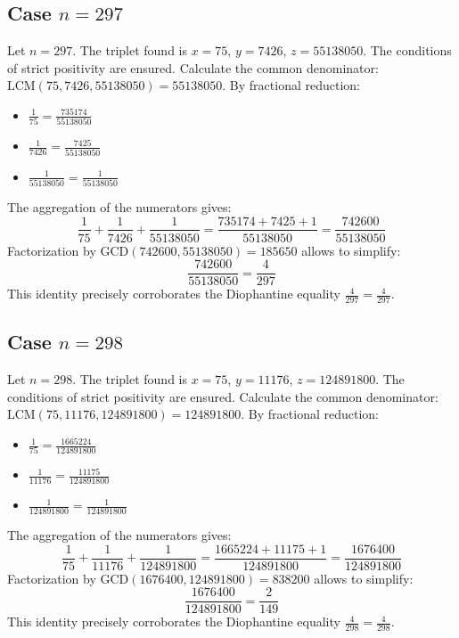 \documentclass[11pt,a4paper]{article}
\begin{document}
\subsection{Case $n = 297$}
Let $n = 297$. The triplet found is $x = 75$, $y = 7426$, $z = 55138050$.
The conditions of strict positivity are ensured.
Calculate the common denominator: $\text{LCM}(75, 7426, 55138050) = 55138050$.
By fractional reduction:
\begin{itemize}
    \item $\frac{1}{75} = \frac{735174}{55138050}$
    \item $\frac{1}{7426} = \frac{7425}{55138050}$
    \item $\frac{1}{55138050} = \frac{1}{55138050}$
\end{itemize}
The aggregation of the numerators gives:
$$ \frac{1}{75} + \frac{1}{7426} + \frac{1}{55138050} = \frac{735174 + 7425 + 1}{55138050} = \frac{742600}{55138050} $$
Factorization by $\text{GCD}(742600, 55138050) = 185650$ allows to simplify:
$$ \frac{742600}{55138050} = \frac{4}{297} $$
This identity precisely corroborates the Diophantine equality $\frac{4}{297} = \frac{4}{297}$.

\subsection{Case $n = 298$}
Let $n = 298$. The triplet found is $x = 75$, $y = 11176$, $z = 124891800$.
The conditions of strict positivity are ensured.
Calculate the common denominator: $\text{LCM}(75, 11176, 124891800) = 124891800$.
By fractional reduction:
\begin{itemize}
    \item $\frac{1}{75} = \frac{1665224}{124891800}$
    \item $\frac{1}{11176} = \frac{11175}{124891800}$
    \item $\frac{1}{124891800} = \frac{1}{124891800}$
\end{itemize}
The aggregation of the numerators gives:
$$ \frac{1}{75} + \frac{1}{11176} + \frac{1}{124891800} = \frac{1665224 + 11175 + 1}{124891800} = \frac{1676400}{124891800} $$
Factorization by $\text{GCD}(1676400, 124891800) = 838200$ allows to simplify:
$$ \frac{1676400}{124891800} = \frac{2}{149} $$
This identity precisely corroborates the Diophantine equality $\frac{4}{298} = \frac{4}{298}$.
\end{document}

